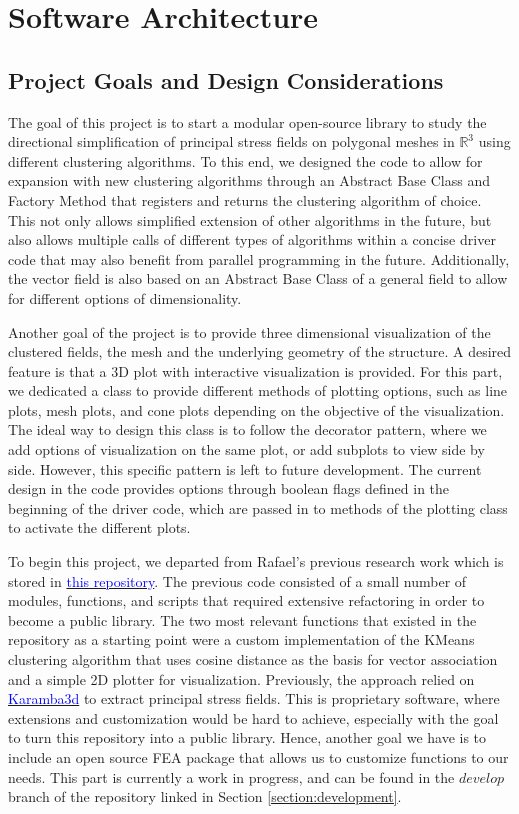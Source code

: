 \documentclass[11pt]{article}
\begin{document}
\section{Software Architecture}

\subsection{Project Goals and Design Considerations}
The goal of this project is to start a modular open-source library to study the directional simplification of principal stress fields on polygonal meshes in $\mathbb{R}^3$ using different clustering algorithms. To this end, we designed the code to allow for expansion with new clustering algorithms through an Abstract Base Class and Factory Method that registers and returns the clustering algorithm of choice. This not only allows simplified extension of other algorithms in the future, but also allows multiple calls of different types of algorithms within a concise driver code that may also benefit from parallel programming in the future. Additionally, the vector field is also based on an Abstract Base Class of a general field to allow for different options of dimensionality. 
 
Another goal of the project is to provide three dimensional visualization of the clustered fields, the mesh and the underlying geometry of the structure. A desired feature is that a 3D plot with interactive visualization is provided. For this part, we dedicated a class to provide different methods of plotting options, such as line plots, mesh plots, and cone plots depending on the objective of the visualization. The ideal way to design this class is to follow the decorator pattern, where we add options of visualization on the same plot, or add subplots to view side by side. However, this specific pattern is left to future development. The current design in the code provides options through boolean flags defined in the beginning of the driver code, which are passed in to methods of the plotting class to activate the different plots.

To begin this project, we departed from Rafael's previous research work which is stored in \href{http://www.github.com/arpastrana/directional_clustering}{\textcolor{blue}{this repository}}. The previous code consisted of a small number of modules, functions, and scripts that required extensive refactoring in order to become a public library. The two most relevant functions that existed in the repository as a starting point were a custom implementation of the KMeans clustering algorithm that uses cosine distance as the basis for vector association and a simple 2D plotter for visualization. Previously, the approach relied on  \href{http://www.karamba3d.com/}{\textcolor{blue}{Karamba3d}} to extract principal stress fields. This is proprietary software, where extensions and customization would be hard to achieve, especially with the goal to turn this repository into a public library. Hence, another goal we have is to include an open source FEA package that allows us to customize functions to our needs. This part is currently a work in progress, and can be found in the $develop$ branch of the repository linked in Section \ref{section:development}.
\end{document}

